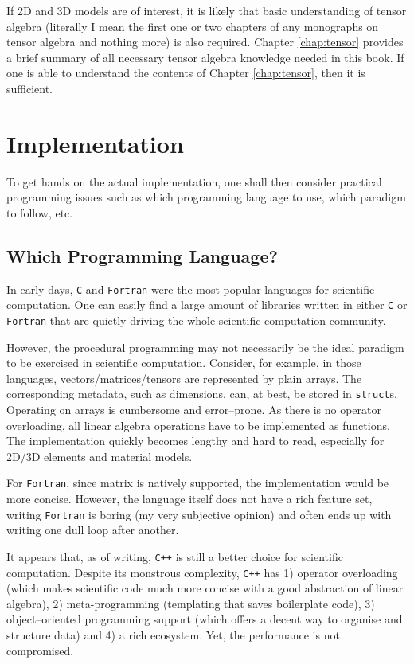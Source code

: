 If 2D and 3D models are of interest, it is likely that basic understanding of tensor algebra (literally I mean the first one or two chapters of any monographs on tensor algebra and nothing more) is also required.
Chapter \ref{chap:tensor} provides a brief summary of all necessary tensor algebra knowledge needed in this book.
If one is able to understand the contents of Chapter \ref{chap:tensor}, then it is sufficient.
\section{Implementation}
To get hands on the actual implementation, one shall then consider practical programming issues such as which programming language to use, which paradigm to follow, etc.
\subsection{Which Programming Language?}
In early days, \texttt{C} and \texttt{Fortran} were the most popular languages for scientific computation.
One can easily find a large amount of libraries written in either \texttt{C} or \texttt{Fortran} that are quietly driving the whole scientific computation community.

However, the procedural programming may not necessarily be the ideal paradigm to be exercised in scientific computation.
Consider, for example, in those languages, vectors/matrices/tensors are represented by plain arrays.
The corresponding metadata, such as dimensions, can, at best, be stored in \texttt{struct}s.
Operating on arrays is cumbersome and error--prone.
As there is no operator overloading, all linear algebra operations have to be implemented as functions.
The implementation quickly becomes lengthy and hard to read, especially for 2D/3D elements and material models.

For \texttt{Fortran}, since matrix is natively supported, the implementation would be more concise.
However, the language itself does not have a rich feature set, writing \texttt{Fortran} is boring (my very subjective opinion) and often ends up with writing one dull loop after another.

It appears that, as of writing, \texttt{C++} is still a better choice for scientific computation.
Despite its monstrous complexity, \texttt{C++} has 1) operator overloading (which makes scientific code much more concise with a good abstraction of linear algebra), 2) meta-programming (templating that saves boilerplate code), 3) object--oriented programming support (which offers a decent way to organise and structure data) and 4) a rich ecosystem.
Yet, the performance is not compromised.

